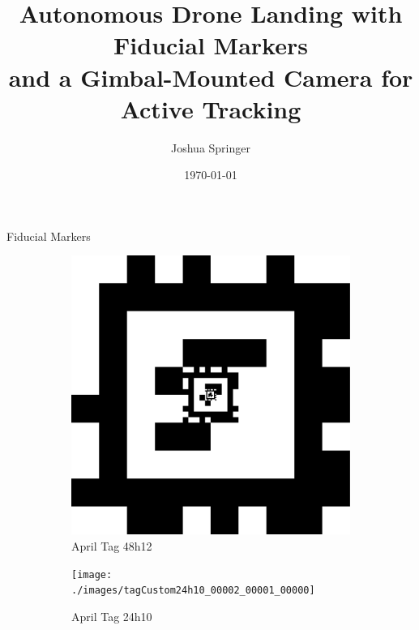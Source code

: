 \documentclass[aspectratio=169]{beamer}
\title{Autonomous Drone Landing with Fiducial Markers\\and a Gimbal-Mounted Camera for Active Tracking}
\author{Joshua Springer}
\institute{Reykjavik University\\Department of Computer Science}
\date{\specialdate\today}
\newcommand{\nologo}{\setbeamertemplate{logo}{}}
\begin{document}
\maketitle

\nologo

\begin{frame}{Fiducial Markers}
	\vspace*{\fill}
	\begin{figure}[]
	    \centering
	    \begin{subfigure}[b]{0.2\linewidth}
		\includegraphics[width=\textwidth]{./images/tagCustom48h12_00002_00001_00000}
		\caption{April Tag 48h12}
		\label{figure:apriltag48h12}
	    \end{subfigure}
		\hspace{0.05\linewidth}
	    \begin{subfigure}[b]{0.2\linewidth}
		\texttt{[image: ./images/tagCustom24h10\_00002\_00001\_00000]}
		\caption{April Tag 24h10}
		\label{figure:apriltag24h10}
	    \end{subfigure}
		\hspace{0.05\linewidth}
	    \begin{subfigure}[b]{0.2\linewidth}

\end{subfigure}
\end{figure}
\end{frame}
\end{document}
